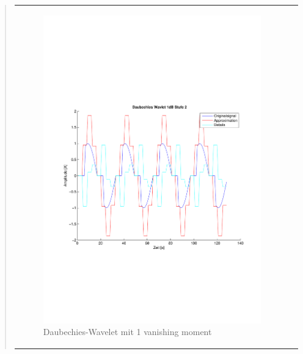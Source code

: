 \begin{quote}
\begin{center}
\begin{tabular}{ll}
\begin{minipage}{0.6\textwidth}
                        \begin{figure}[H]
                            \label{fig:}
                            \includegraphics[scale=0.45, trim = 0.8cm 6cm 3cm
                            7.5cm,
                            clip]{./Bilder/Termin8/Daubechies_Wavlet_1db_lvl_2}
                            \caption{Daubechies-Wavelet mit 1 vanishing moment}
                        \end{figure}
    
                    \end{minipage}
                    \begin{minipage}{0.6\textwidth}
    

\end{minipage}
\end{tabular}
\end{center}
\end{quote}
